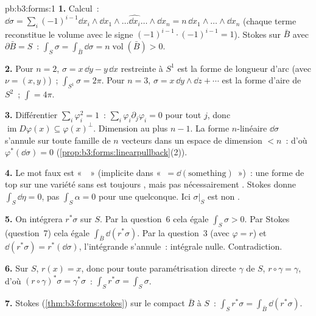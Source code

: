 \begin{solution}{pb:b3:forms:1}
\textbf{1.} Calcul~: $\dd\sigma = \sum_i(-1)^{i-1}\dd x_i
\wedge \dd x_1\wedge\dots\widehat{\dd x_i}\dots\wedge\dd
x_n = n\,\dd x_1\wedge\dots\wedge\dd x_n$ (chaque terme
reconstitue le volume avec le signe $(-1)^{i-1}\cdot
(-1)^{i-1} = 1$). Stokes sur $\bar B$ avec $\partial\bar B
= S$~: $\int_S\sigma = \int_{\bar B}\dd\sigma =
n\operatorname{vol}(\bar B) > 0$.

\textbf{2.} Pour $n = 2$, $\sigma = x\,\dd y - y\,\dd x$
restreinte à $S^1$ est la forme de longueur d'arc (avec
$\nu = (x,y)$)~; $\int_{S^1}\sigma = 2\pi$. Pour $n = 3$,
$\sigma = x\,\dd y\wedge\dd z + \cdots$ est la forme d'aire
de $S^2$~; $\int = 4\pi$.

\textbf{3.} Différentier $\sum_i\varphi_i^2 = 1$~:
$\sum_i\varphi_i\partial_j\varphi_i = 0$ pour tout $j$,
donc $\operatorname{im}D\varphi(x) \subseteq
\varphi(x)^\perp$. Dimension au plus $n-1$. La forme
$n$-linéaire $\dd\sigma$ s'annule sur toute famille de $n$
vecteurs dans un espace de dimension $< n$~: d'où
$\varphi^*(\dd\sigma) = 0$
(\cref{prop:b3:forms:linearpullback}(2)).

\textbf{4.} Le mot faux est «~~» (implicite dans
«~$= \dd(\text{something})$~»)~: une forme de  top sur
une variété sans  est toujours , mais pas
nécessairement . Stokes donne $\int_S\dd\eta = 0$,
pas $\int_S\alpha = 0$ pour une  quelconque.
Ici $\sigma|_S$ est  non .

\textbf{5.} On intégrera $r^*\sigma$ sur $S$. Par la
question~6 cela égale $\int_S\sigma > 0$. Par Stokes
(question~7) cela égale $\int_{\bar B}\dd(r^*\sigma)$.
Par la question~3 (avec $\varphi = r$) et
$\dd(r^*\sigma) = r^*(\dd\sigma)$, l'intégrande s'annule~:
intégrale nulle. Contradiction.

\textbf{6.} Sur $S$, $r(x) = x$, donc pour toute
paramétrisation directe $\gamma$ de $S$, $r\circ\gamma =
\gamma$, d'où $(r\circ\gamma)^*\sigma = \gamma^*\sigma$~:
$\int_S r^*\sigma = \int_S\sigma$.

\textbf{7.} Stokes (\cref{thm:b3:forms:stokes}) sur le
compact $\bar B$ à  $S$~: $\int_S r^*\sigma =
\int_{\bar B}\dd(r^*\sigma)$.


\end{solution}
